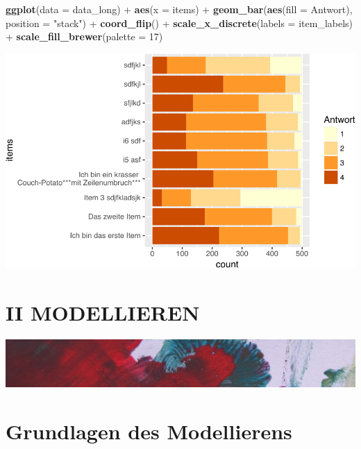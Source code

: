 \documentclass[12pt,ngerman,]{book}
\newenvironment{Shaded}{\begin{snugshade}}{\end{snugshade}}
\newcommand{\KeywordTok}[1]{\textcolor[rgb]{0.13,0.29,0.53}{\textbf{{#1}}}}
\newcommand{\DataTypeTok}[1]{\textcolor[rgb]{0.13,0.29,0.53}{{#1}}}
\newcommand{\DecValTok}[1]{\textcolor[rgb]{0.00,0.00,0.81}{{#1}}}
\newcommand{\StringTok}[1]{\textcolor[rgb]{0.31,0.60,0.02}{{#1}}}
\newcommand{\NormalTok}[1]{{#1}}
\renewenvironment{Shaded}{\begin{kframe}}{\end{kframe}}
\begin{document}
\begin{Shaded}
\begin{Highlighting}[]
\KeywordTok{ggplot}\NormalTok{(}\DataTypeTok{data =} \NormalTok{data_long) +}
\StringTok{  }\KeywordTok{aes}\NormalTok{(}\DataTypeTok{x =} \NormalTok{items)  +}
\StringTok{  }\KeywordTok{geom_bar}\NormalTok{(}\KeywordTok{aes}\NormalTok{(}\DataTypeTok{fill =} \NormalTok{Antwort), }\DataTypeTok{position =} \StringTok{"stack"}\NormalTok{) +}
\StringTok{  }\KeywordTok{coord_flip}\NormalTok{() +}
\StringTok{  }\KeywordTok{scale_x_discrete}\NormalTok{(}\DataTypeTok{labels =} \NormalTok{item_labels) +}
\StringTok{  }\KeywordTok{scale_fill_brewer}\NormalTok{(}\DataTypeTok{palette =} \DecValTok{17}\NormalTok{)}
\end{Highlighting}
\end{Shaded}

\begin{center}\includegraphics[width=0.7\linewidth]{056_Fallstudie_Visualisierung_files/figure-latex/unnamed-chunk-16-1} \end{center}

\chapter*{II MODELLIEREN}\label{ii-modellieren}

\begin{center}\includegraphics[width=1\linewidth]{images/farb1} \end{center}

\chapter{Grundlagen des Modellierens}\label{mod1}
\end{document}

